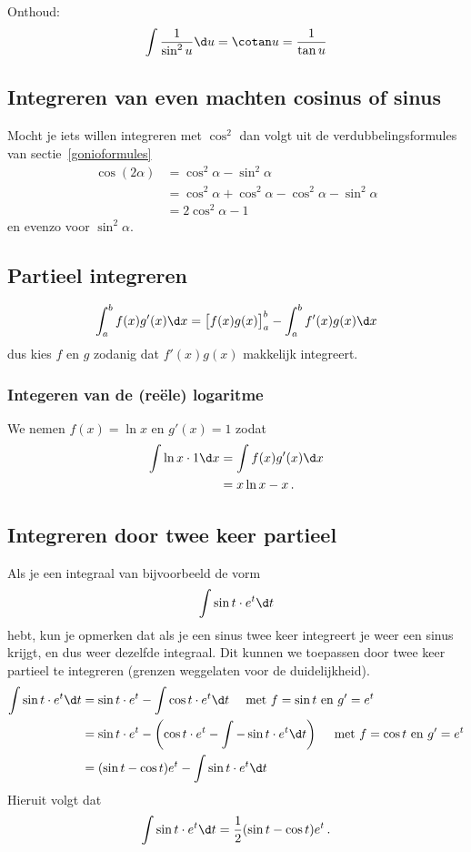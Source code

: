       Onthoud:
      \begin{align*}
          \int \frac{1}{\sin^2 u} \d u = \cotan u = \frac{1}{\tan u}
      \end{align*}
\subsection{Integreren van even machten cosinus of sinus}\label{subsec:integrerenVanEvenMachtenCosinusOfSinus}
Mocht je iets willen integreren met $\cos^2$ dan volgt uit de verdubbelingsformules van sectie~\ref{gonioformules}
	 \begin{align*}
		  \cos (2\alpha) &= \cos^2 \alpha - \sin^2 \alpha \\
	 		 &=  \cos^2 \alpha + \cos^2 \alpha - \cos^2 \alpha - \sin^2 \alpha \\
	 		 &= 2\cos^2 \alpha -1
	 	 \end{align*}
	 	 en evenzo voor $\sin^2 \alpha$.
      \subsection{Partieel integreren}\label{subsec:partieelIntegreren}
          \[
              \int_a^b f(x) g'(x) \d x = \big[f(x)g(x)\big]_a^b - \int_a^b f'(x) g(x) \d x
           \]
           dus kies $f$ en $g$ zodanig dat $f'(x)g(x)$ makkelijk integreert.
           \subsubsection{Integeren van de (re\"ele) logaritme}
		We nemen $f(x)=\ln x$ en $g'(x)=1$ zodat
		\begin{align*}
			\int \ln x \cdot 1 \d x &= \int f(x)g'(x) \d x \\
			&= x \ln x - x \,.
		\end{align*}
      \subsection{Integreren door twee keer partieel}\label{subsec:integrerenDoorTweeKeerPartieel}
          Als je een integraal van bijvoorbeeld de vorm
          \[
              \int \sin t \cdot e^t \d t
          \]
          hebt, kun je opmerken dat als je een sinus twee keer integreert je weer een sinus
          krijgt, en dus weer dezelfde integraal.
          Dit kunnen we toepassen
          door twee keer partieel te integreren (grenzen weggelaten voor de duidelijkheid).
          \begin{align*}
              \int \sin t \cdot e^t \d t &= \sin t \cdot e^t - \int \cos t \cdot e^t \d t
              \quad \text{ met $f=\sin t$ en $g'=e^t$} \\
              &= \sin t \cdot e^t - \left( \cos t \cdot e^t - \int - \sin t \cdot e^t \d t \right)
              \quad \text{ met $f=\cos t$ en $g'=e^t$} \\
              &= ( \sin t - \cos t ) e^t -  \int \sin t \cdot e^t \d t
          \end{align*}
          Hieruit volgt dat
          \[  \int \sin t \cdot e^t \d t = \frac{1}{2} ( \sin t - \cos t ) e^t\,. \]
